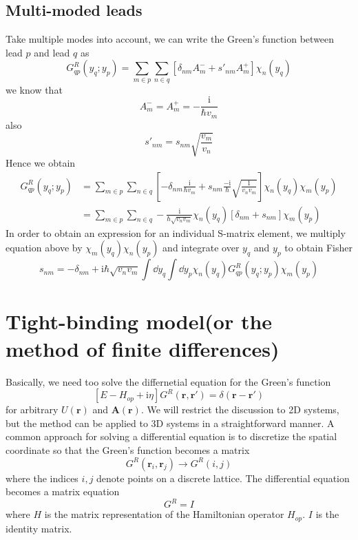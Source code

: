 \documentclass[11pt,a4paper]{book}
\theoremstyle{plain}
\theoremstyle{definition}
\theoremstyle{remark}
\newcommand{\ii}{\mathrm{i}}                      %
\renewcommand{\vec}[1]{\boldsymbol{#1}}
\begin{document}
\subsection{Multi-moded leads}
Take multiple modes into account, we can write the Green's function between lead $p$ and lead $q$ as
\begin{equation}
    G^R_{qp}(y_q; y_p) = \sum_{m \in p} \sum_{n \in q} \left[ \delta_{nm}A_m^- + s'_{nm}A_m^+\right]\chi_n(y_q)
\end{equation}
we know that 
\begin{equation}
    A_m^- = A_m^+ = -\frac{\ii}{\hbar v_m}
\end{equation}
also
\begin{equation}
    s'_{nm} = s_{nm} \sqrt{\frac{v_m}{v_n}}
\end{equation}
Hence we obtain
\begin{equation}
    \begin{aligned}
        G^R_{qp}(y_q; y_p) & = \sum_{m \in p} \sum_{n \in q} \left[ -\delta_{nm} \frac{\ii}{\hbar v_m} + s_{nm} \frac{-\ii}{\hbar} \sqrt{\frac{1}{v_n v_m}} \right] \chi_n(y_q) \chi_m(y_p) \\
        & = \sum_{m \in p} \sum_{n \in q} -\frac{\ii}{\hbar \sqrt{v_n v_m}} \chi_n(y_q) \left[ \delta_{nm} + s_{nm} \right] \chi_m(y_p)
    \end{aligned}
\end{equation}
In order to obtain an expression for an individual S-matrix element, we multiply equation above by $\chi_m(y_q) \chi_n(y_p)$ and integrate over $y_q$ and $y_p$ to obtain Fisher
\begin{equation}
    s_{nm} = -\delta_{nm} + \ii \hbar \sqrt{v_n v_m} \int \dd y_q \int \dd y_p \chi_n(y_q) G^R_{qp}(y_q; y_p) \chi_m(y_p)
\end{equation}
\section{Tight-binding model(or the method of finite differences)}
Basically, we need too solve the differnetial equation for the Green's function
\begin{equation}
    \left[E - H_{op} + \ii \eta \right] G^R(\vec{r},\vec{r}') = \delta(\vec{r} - \vec{r}')
\end{equation}
for arbitrary $U(\vec{r})$ and $\vec{A}(\vec{r})$. We will restrict the discussion to 2D systems, but the method can be applied to 3D systems in a straightforward manner. A common approach for solving a differential equation is to discretize the spatial coordinate so that the Green's function becomes a matrix
\begin{equation}
    G^R(\vec{r}_i, \vec{r}_j) \to G^R(i,j)
\end{equation}
where the indices $i,j$ denote points on a discrete lattice. The differential equation becomes a matrix equation
\begin{equation}
    [(E+\ii \eta)I - H] G^R = I 
\end{equation}
where $H$ is the matrix representation of the Hamiltonian operator $H_{op}$. $I$ is the identity matrix.
\end{document}
